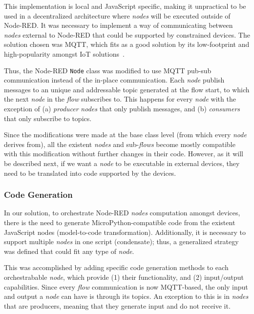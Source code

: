 This implementation is local and JavaScript specific, making it unpractical to be used in a decentralized architecture where \textit{nodes} will be executed outside of Node-RED. It was necessary to implement a way of communicating between \textit{nodes} external to Node-RED that could be supported by constrained devices. The solution chosen was MQTT, which fits as a good solution by its low-footprint and high-popularity amongst IoT solutions~\cite{soni2017survey}.

Thus, the Node-RED \texttt{Node} class was modified to use MQTT pub-sub communication instead of the in-place communication. Each \textit{node} publish messages to an unique and addressable topic generated at the flow start, to which the next \textit{node} in the \textit{flow} subscribes to. This happens for every \textit{node} with the exception of (a) \textit{producer} \textit{nodes} that only publish messages, and (b) \textit{consumers} that only subscribe to topics.

Since the modifications were made at the base class level (from which every \textit{node} derives from), all the existent \textit{nodes} and sub-\textit{flows} become mostly compatible with this modification without further changes in their code. However, as it will be described next, if we want a \textit{node} to be executable in external devices, they need to be translated into code supported by the devices.

\subsubsection{Code Generation}\label{sec:code_generation}

In our solution, to orchestrate Node-RED \textit{nodes} computation amongst devices, there is the need to generate MicroPython-compatible code from the existent JavaScript nodes (\ie model-to-code transformation). Additionally, it is necessary to support multiple \textit{nodes} in one script (\ie condensate); thus, a generalized strategy was defined that could fit any type of \textit{node}.

This was accomplished by adding specific code generation methods to each orchestrabable \textit{node}, which provide (1) their functionality, and (2) input/output capabilities. Since every \textit{flow} communication is now MQTT-based, the only input and output a \textit{node} can have is through its topics. An exception to this is in \textit{nodes} that are producers, meaning that they generate input and do not receive it. 

